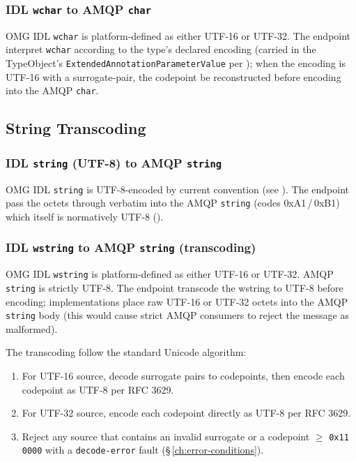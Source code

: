 \documentclass{../styles/zerodds-vendor-spec}
\begin{document}
\subsubsection{IDL \texttt{wchar} to AMQP \texttt{char}}

OMG IDL \texttt{wchar} is platform-defined as either UTF-16 or
UTF-32. The endpoint  interpret \texttt{wchar}
according to the type's declared encoding (carried in the
TypeObject's \texttt{ExtendedAnnotationParameterValue} per
); when the encoding is
UTF-16 with a surrogate-pair, the codepoint  be
reconstructed before encoding into the AMQP \texttt{char}.

\subsection{String Transcoding}\label{sec:wstring-encoding}

\subsubsection{IDL \texttt{string} (UTF-8) to AMQP \texttt{string}}

OMG IDL \texttt{string} is UTF-8-encoded by current convention
(see ). The endpoint
 pass the octets through verbatim into the AMQP
\texttt{string} (codes \textsf{0xA1}\,/\,\textsf{0xB1}) which
itself is normatively UTF-8
().

\subsubsection{IDL \texttt{wstring} to AMQP \texttt{string} (transcoding)}

OMG IDL \texttt{wstring} is platform-defined as either UTF-16 or
UTF-32. AMQP \texttt{string} is strictly UTF-8. The endpoint
 transcode the wstring to UTF-8 before encoding;
implementations  place raw UTF-16 or UTF-32
octets into the AMQP \texttt{string} body (this would cause
strict AMQP consumers to reject the message as malformed).

The transcoding  follow the standard Unicode
algorithm:

\begin{enumerate}
  \item For UTF-16 source, decode surrogate pairs to codepoints,
        then encode each codepoint as UTF-8 per RFC 3629.
  \item For UTF-32 source, encode each codepoint directly as
        UTF-8 per RFC 3629.
  \item Reject any source that contains an invalid surrogate or
        a codepoint $\geq$ \texttt{0x11\,0000} with a
        \texttt{decode-error} fault
        (\S\,\ref{ch:error-conditions}).
\end{enumerate}
\end{document}
